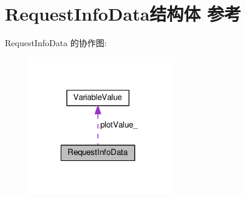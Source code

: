 \hypertarget{struct_request_info_data}{\section{Request\+Info\+Data结构体 参考}
\label{struct_request_info_data}
}


Request\+Info\+Data 的协作图\+:
\nopagebreak
\begin{figure}[H]
\begin{center}
\leavevmode
\includegraphics[width=174pt]{struct_request_info_data__coll__graph}
\end{center}
\end{figure}

